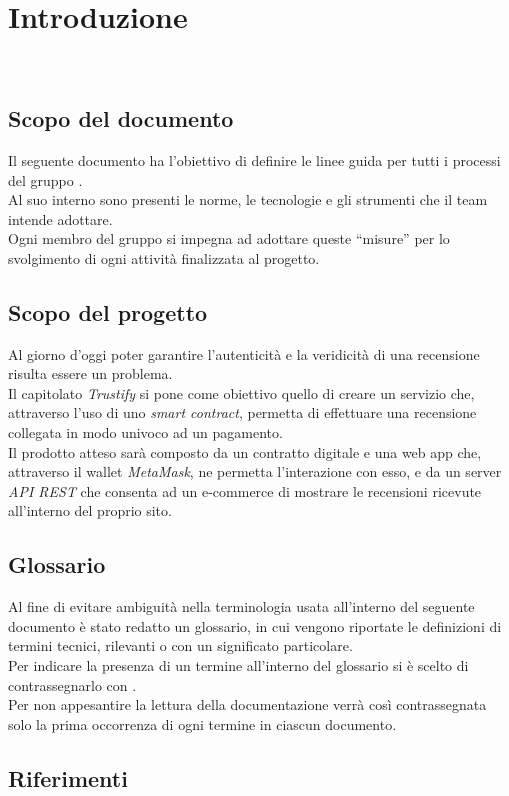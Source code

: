 \section{Introduzione}\
\subsection{Scopo del documento}
Il seguente documento ha l'obiettivo di definire le linee guida per tutti i
processi del gruppo \groupName. \\ Al suo interno sono presenti le norme, le
tecnologie e gli strumenti che il team intende adottare. \\ Ogni membro del
gruppo si impegna ad adottare queste “misure” per lo svolgimento di ogni
attività finalizzata al progetto.

\subsection{Scopo del progetto}
Al giorno d'oggi poter garantire l'autenticità e la veridicità di una
recensione\glo\: risulta essere un problema. \\ Il capitolato \textit{Trustify} si
pone come obiettivo quello di creare un servizio che, attraverso l'uso di uno
\textit{smart contract}\glo\:, permetta di effettuare una recensione collegata in
modo univoco ad un pagamento. \\ Il prodotto atteso sarà composto da un
contratto digitale e una web app che, attraverso il wallet \textit{MetaMask}\glo\:, ne
permetta l'interazione con esso, e da un server \textit{API REST}\glo\: che consenta ad un
e-commerce\glo\: di mostrare le recensioni ricevute all'interno del proprio sito.

\subsection{Glossario}
Al fine di evitare ambiguità nella terminologia usata all'interno del seguente
documento è stato redatto un glossario, in cui vengono riportate le definizioni
di termini tecnici, rilevanti o con un significato particolare. \\ Per indicare
la presenza di un termine all'interno del glossario si è scelto di
contrassegnarlo con \glo.\\ Per non appesantire la lettura della documentazione
verrà così contrassegnata solo la prima occorrenza di ogni termine in ciascun
documento.

\subsection{Riferimenti}
